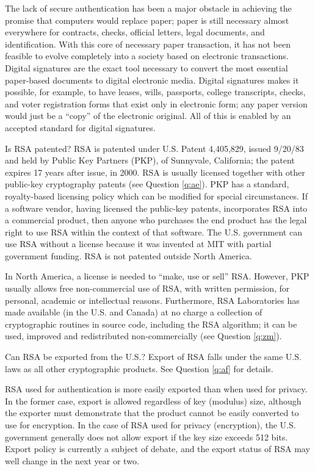 The lack of secure authentication has been a major obstacle in achieving
the promise that computers would replace paper; paper is still necessary
almost everywhere for contracts, checks, official letters, legal documents,
and identification. With this core of necessary paper transaction, it has not 
been feasible to evolve completely into a society based on electronic 
transactions. Digital signatures are the exact tool necessary to convert 
the most essential paper-based documents to digital electronic media. 
Digital signatures makes it possible, for example, to have leases, wills, 
passports, college transcripts, checks, and voter registration forms that 
exist only in electronic form; any paper version would just be a ``copy'' 
of the electronic original. All of this is enabled by an accepted standard 
for digital signatures.

{Is RSA patented? }
RSA is patented under U.S. Patent 4,405,829, issued 9/20/83 and held by
Public Key Partners (PKP), of Sunnyvale, California; the patent expires 17 
years after issue, in 2000. RSA is usually licensed together with other 
public-key cryptography patents (see Question \ref{q:ae}). PKP has a 
standard, royalty-based licensing policy which can be modified for special 
circumstances. If a software vendor, having licensed the public-key patents, 
incorporates RSA into a commercial product, then anyone who purchases the 
end product has the legal right to use RSA within the context of that 
software. The U.S. government can use RSA without a license because it was 
invented at MIT with partial government funding. RSA is not patented outside 
North America.

In North America, a license is needed to ``make, use or sell'' RSA. However,
PKP usually allows free non-commercial use of RSA, with written permission, 
for personal, academic or intellectual reasons. Furthermore, RSA 
Laboratories has made available (in the U.S. and Canada) at no charge a 
collection of cryptographic routines in source code, including the RSA 
algorithm; it can be used, improved and redistributed non-commercially 
(see Question \ref{q:zm}).

{Can RSA be exported from the U.S.?}
Export of RSA falls under the same U.S. laws as all other cryptographic
products. See Question \ref{q:af} for details.

RSA used for authentication is more easily exported than when used for
privacy. In the former case, export is allowed regardless of key (modulus)
size, although the exporter must demonstrate that the product cannot be
easily converted to use for encryption. In the case of RSA used for 
privacy (encryption), the U.S. government generally does not allow
export if the key size exceeds 512 bits. Export policy is currently a
subject of debate, and the export status of RSA may well change in the
next year or two.

